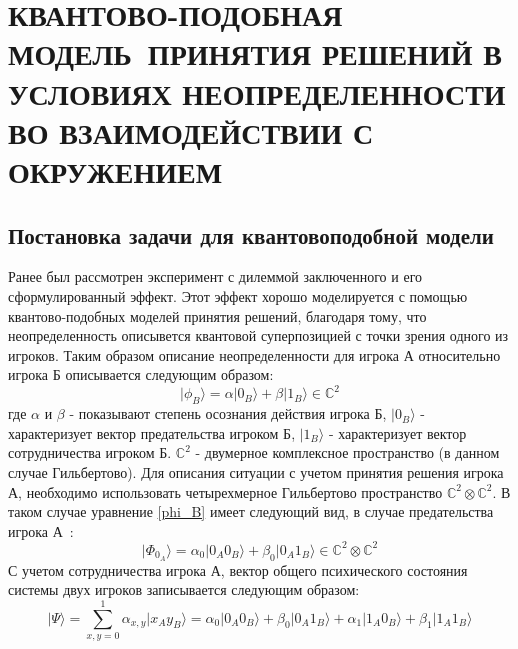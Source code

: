 \chapter{КВАНТОВО-ПОДОБНАЯ МОДЕЛЬ~ПРИНЯТИЯ РЕШЕНИЙ В УСЛОВИЯХ НЕОПРЕДЕЛЕННОСТИ ВО ВЗАИМОДЕЙСТВИИ С ОКРУЖЕНИЕМ}
\section{Постановка задачи для квантовоподобной модели}

Ранее был рассмотрен эксперимент с дилеммой заключенного и его сформулированный эффект.
Этот эффект хорошо моделируется с помощью квантово-подобных моделей принятия решений, благодаря
тому, что неопределенность описывется квантовой суперпозицией с точки зрения одного из игроков.
Таким образом описание неопределенности для игрока А относительно игрока Б описывается следующим образом:
\begin{equation}\label{phi_B}
    \vert \phi_{B} \rangle = \alpha \vert 0_{B} \rangle + \beta \vert 1_{B} \rangle \in \mathbb{C}^{2} %
\end{equation}
где $\alpha$ и $\beta$ - показывают степень осознания действия игрока Б, $\vert 0_{B} \rangle$ - характеризует
вектор предательства игроком Б, $\vert 1_{B} \rangle$ - характеризует вектор сотрудничества игроком Б.
$\mathbb{C}^{2}$ - двумерное комплексное пространство (в данном случае Гильбертово).
Для описания ситуации с учетом принятия решения игрока А, необходимо использовать четырехмерное Гильбертово
пространство $\mathbb{C}^{2} \otimes \mathbb{C}^{2}$.
В таком случае уравнение \eqref{phi_B} имеет следующий вид, в случае предательства игрока А~\citep{asano2011quantum}:
\begin{equation}
    \vert \Phi_{0_{A}} \rangle = \alpha_{0} \vert 0_{A} 0_{B} \rangle + \beta_{0} \vert 0_{A} 1_{B} \rangle \in \mathbb{C}^{2} \otimes \mathbb{C}^{2}
\end{equation}
С учетом сотрудничества игрока А, вектор общего психического состояния системы двух игроков записывается
следующим образом:
\begin{equation}
    \vert \Psi \rangle = \sum_{x,y=0}^{1} \alpha_{x,y} \vert x_{A} y_{B} \rangle =
    \alpha_{0} \vert 0_{A} 0_{B} \rangle + \beta_{0} \vert 0_{A} 1_{B} \rangle +
    \alpha_{1} \vert 1_{A} 0_{B} \rangle + \beta_{1} \vert 1_{A} 1_{B} \rangle
\end{equation}

